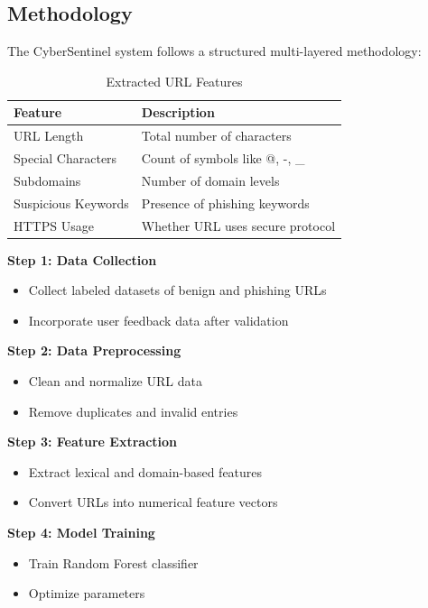 \subsection{Methodology}

The CyberSentinel system follows a structured multi-layered methodology:

\begin{table}[H]
	\centering
	\caption{Extracted URL Features}
	\begin{tabular}{ll}
		\toprule
		\textbf{Feature} & \textbf{Description} \\
		\midrule
		URL Length & Total number of characters \\
		Special Characters & Count of symbols like @, -, \_ \\
		Subdomains & Number of domain levels \\
		Suspicious Keywords & Presence of phishing keywords \\
		HTTPS Usage & Whether URL uses secure protocol \\
		\bottomrule
	\end{tabular}
\end{table}

\textbf{Step 1: Data Collection}
\begin{itemize}
	\item Collect labeled datasets of benign and phishing URLs
	\item Incorporate user feedback data after validation
\end{itemize}

\textbf{Step 2: Data Preprocessing}
\begin{itemize}
	\item Clean and normalize URL data
	\item Remove duplicates and invalid entries
\end{itemize}

\textbf{Step 3: Feature Extraction}
\begin{itemize}
	\item Extract lexical and domain-based features
	\item Convert URLs into numerical feature vectors
\end{itemize}

\textbf{Step 4: Model Training}
\begin{itemize}
	\item Train Random Forest classifier
	\item Optimize parameters
\end{itemize}

